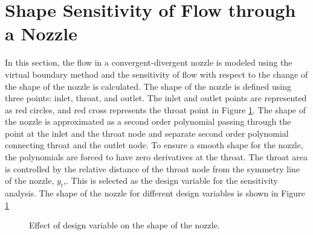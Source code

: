 \section{Shape Sensitivity of Flow through a Nozzle}
In this section, the flow in a convergent-divergent nozzle is modeled using the virtual boundary method and the sensitivity of flow with respect to the change of the shape of the nozzle is calculated.  The shape of the nozzle is defined using three points: inlet, throat, and outlet. The inlet and outlet points are represented as red circles, and red cross represents the throat point in Figure \ref{fig:C4_nozzleShape}. The shape of the nozzle is approximated as a second order polynomial passing through the point at the inlet and the throat node and separate second order polynomial connecting throat and the outlet node. To ensure a smooth shape for the nozzle, the polynomials are forced to have zero derivatives at the throat. The throat area is controlled by the relative distance of the throat node from the symmetry line of the nozzle, $y_t$,. This is selected as the design variable for the sensitivity analysis. The shape of the nozzle for different design variables is shown in Figure \ref{fig:C4_nozzleShape}

\begin{figure}[H]
    \centering
    \quad
    \caption{Effect of design variable on the shape of the nozzle.}
    \label{fig:C4_nozzleShape}
\end{figure}

